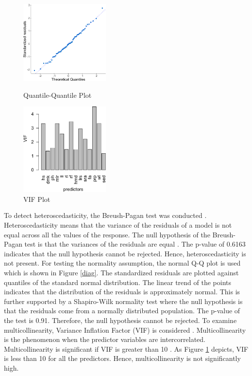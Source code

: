 \documentclass[preprint,review,12pt]{elsarticle}
\begin{document}
\begin{figure}
  \centering
\begin{minipage}[!th]{0.45\textwidth}
\centering
   \includegraphics[width=45mm,keepaspectratio]{qqplot.pdf}
    \caption{Quantile-Quantile Plot}
     \label{diag}
\end{minipage}
\begin{minipage}[!th]{0.45\textwidth}\centering
   \includegraphics[width=45mm,keepaspectratio]{vif.pdf}
    \caption{VIF Plot}
     \label{vif}
\end{minipage}
\end{figure}

To detect heteroscedasticity, the Breush-Pagan test was conducted \cite{breusch1979simple}. Heteroscedasticity means that the variance of the residuals of a model is not equal across all the values of the response. The null hypothesis of the Breush-Pagan test is that the variances of the residuals are equal \cite{breusch1979simple}. The p-value of 0.6163 indicates that the null hypothesis cannot be rejected. Hence, heteroscedasticity is not present. For testing the normality assumption, the normal Q-Q plot is used which is shown in Figure \ref{diag}. The standardized residuals are plotted against quantiles of the standard normal distribution. The linear trend of the points indicates that the distribution of the residuals is approximately normal. This is further supported by a Shapiro-Wilk normality test where the null hypothesis is that the residuals come from a normally distributed population. The p-value of the test is 0.91. Therefore, the null hypothesis cannot be rejected. To examine multicollinearity, Variance Inflation Factor (VIF) is considered \cite{chatterjee1977regression}. Multicollinearity is the phenomenon when the predictor variables are intercorrelated. Multicollinearity is significant if VIF is greater than 10 \cite{chatterjee1977regression}. As Figure \ref{vif} depicts, VIF is less than 10 for all the predictors. Hence, multicollinearity is not significantly high. 

\end{document}

